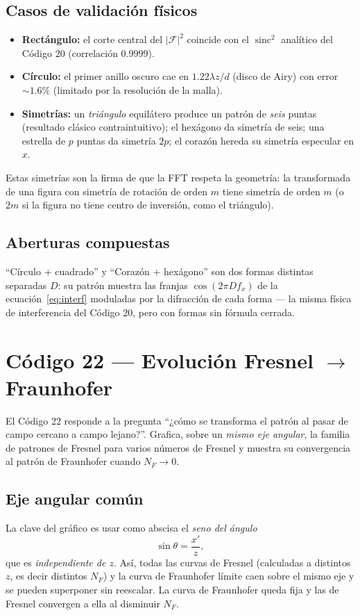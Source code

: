 \documentclass[11pt,a4paper]{article}
\newcommand{\sinc}{\operatorname{sinc}}
\newcommand{\Fou}{\mathcal{F}}
\begin{document}
\subsection{Casos de validación físicos}
\begin{itemize}[leftmargin=1.4em]
\item \textbf{Rectángulo:} el corte central del $|\Fou|^2$ coincide con el
$\sinc^2$ analítico del Código 20 (correlación $0.9999$).
\item \textbf{Círculo:} el primer anillo oscuro cae en $1.22\lambda z/d$ (disco de
Airy) con error $\sim1.6\%$ (limitado por la resolución de la malla).
\item \textbf{Simetrías:} un \emph{triángulo} equilátero produce un patrón de
\emph{seis} puntas (resultado clásico contraintuitivo); el hexágono da simetría
de seis; una estrella de $p$ puntas da simetría $2p$; el corazón hereda su
simetría especular en $x$.
\end{itemize}
Estas simetrías son la firma de que la FFT respeta la geometría: la transformada
de una figura con simetría de rotación de orden $m$ tiene simetría de orden $m$
(o $2m$ si la figura no tiene centro de inversión, como el triángulo).

\subsection{Aberturas compuestas}
``Círculo + cuadrado'' y ``Corazón + hexágono'' son dos formas distintas separadas
$D$: su patrón muestra las franjas $\cos(2\pi D f_x)$ de la
ecuación~\eqref{eq:interf} moduladas por la difracción de cada forma --- la misma
física de interferencia del Código 20, pero con formas sin fórmula cerrada.

\section{Código 22 --- Evolución Fresnel $\rightarrow$ Fraunhofer}

El Código 22 responde a la pregunta ``¿cómo se transforma el patrón al pasar de
campo cercano a campo lejano?''. Grafica, sobre un \emph{mismo eje angular}, la
familia de patrones de Fresnel para varios números de Fresnel y muestra su
convergencia al patrón de Fraunhofer cuando $N_F\to 0$.

\subsection{Eje angular común}
La clave del gráfico es usar como abscisa el \emph{seno del ángulo}
\begin{equation}
\sin\theta = \frac{x'}{z},
\end{equation}
que es \emph{independiente de $z$}. Así, todas las curvas de Fresnel (calculadas a
distintos $z$, es decir distintos $N_F$) y la curva de Fraunhofer límite caen
sobre el mismo eje y se pueden superponer sin reescalar. La curva de Fraunhofer
queda fija y las de Fresnel convergen a ella al disminuir $N_F$.
\end{document}
